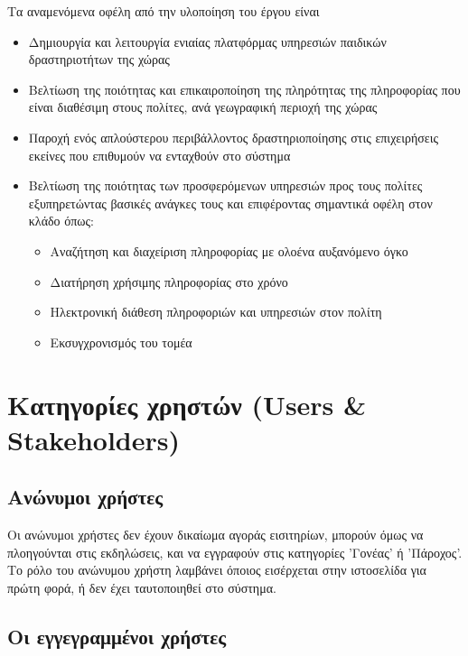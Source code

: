\documentclass[letterpaper,6pt]{article}
\begin{document}
Τα αναμενόμενα οφέλη από την υλοποίηση του έργου είναι
\begin{itemize}
  \item Δημιουργία και λειτουργία ενιαίας πλατφόρμας υπηρεσιών παιδικών δραστηριοτήτων της χώρας
	 \item Βελτίωση της ποιότητας και επικαιροποίηση της πληρότητας της πληροφορίας που είναι διαθέσιμη στους πολίτες, ανά γεωγραφική περιοχή της χώρας
	 \item Παροχή ενός απλούστερου περιβάλλοντος δραστηριοποίησης στις επιχειρήσεις εκείνες που επιθυμούν να ενταχθούν  στο σύστημα
	 \item Βελτίωση της ποιότητας των προσφερόμενων υπηρεσιών προς τους πολίτες εξυπηρετώντας βασικές ανάγκες τους και επιφέροντας σημαντικά οφέλη στον κλάδο όπως: \begin{itemize}
  \item Αναζήτηση και διαχείριση πληροφορίας με ολοένα αυξανόμενο όγκο
		\item Διατήρηση χρήσιμης πληροφορίας στο χρόνο
		\item Ηλεκτρονική διάθεση πληροφοριών και υπηρεσιών στον πολίτη
		\item Εκσυγχρονισμός του τομέα
\end{itemize}
\end{itemize}

\section{Κατηγορίες χρηστών (Users \& Stakeholders)}

    \subsection{Ανώνυμοι χρήστες}
Οι ανώνυμοι χρήστες δεν έχουν δικαίωμα αγοράς εισιτηρίων, μπορούν όμως να πλοηγούνται στις εκδηλώσεις, και να εγγραφούν στις κατηγορίες 'Γονέας' ή 'Πάροχος'. Το ρόλο του ανώνυμου χρήστη λαμβάνει όποιος εισέρχεται στην ιστοσελίδα για πρώτη φορά, ή δεν έχει ταυτοποιηθεί στο σύστημα. 

\subsection{Οι εγγεγραμμένοι χρήστες}
\end{document}
